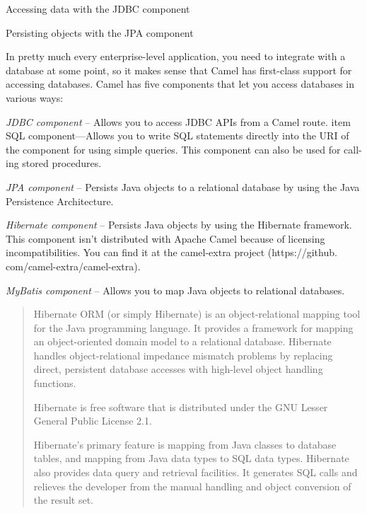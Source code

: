 \documentclass[Screen16to9,17pt]{foils}
\begin{document}

\begin{list2}
\item Accessing data with the JDBC component
\item Persisting objects with the JPA component
\end{list2}




In pretty much every enterprise-­level application, you need to integrate with a database at some point, so it makes sense that Camel has first-­class support for accessing databases. Camel has five components that let you access databases in various ways:
\begin{list2}
\item \emph{JDBC component} -- Allows you to access JDBC APIs from a Camel route.
item SQL component—Allows you to write SQL statements directly into the URI of the
component for using simple queries. This component can also be used for call-
ing stored procedures.
\item \emph{JPA component} -- Persists Java objects to a relational database by using the Java Persistence Architecture.
\item \emph{Hibernate component} -- Persists Java objects by using the Hibernate framework.
This component isn’t distributed with Apache Camel because of licensing
incompatibilities. You can find it at the camel-­extra project (https://github.
com/camel-­extra/camel-­extra).
\item \emph{MyBatis component} -- Allows you to map Java objects to relational databases.
\end{list2}



\begin{quote}
  Hibernate ORM (or simply Hibernate) is an object-relational mapping tool for the Java programming language. It provides a framework for mapping an object-oriented domain model to a relational database. Hibernate handles object-relational impedance mismatch problems by replacing direct, persistent database accesses with high-level object handling functions.

  Hibernate is free software that is distributed under the GNU Lesser General Public License 2.1.

  Hibernate's primary feature is mapping from Java classes to database tables, and mapping from Java data types to SQL data types. Hibernate also provides data query and retrieval facilities. It generates SQL calls and relieves the developer from the manual handling and object conversion of the result set.
\end{quote}
\end{document}
